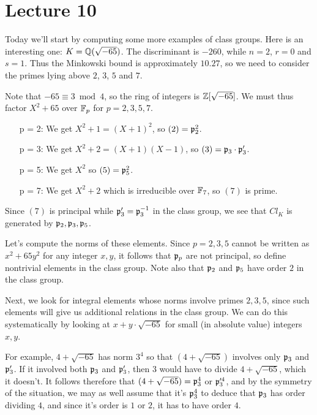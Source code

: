 \section{Lecture 10}

Today we'll start by computing some more examples of class groups.
Here is an interesting one: $K = \mathbb{Q}(\sqrt{-65})$.
The discriminant is $-260$, while $n = 2$, $r = 0$ and $s = 1$.
Thus the Minkowski bound is approximately $10.27$, so we need to consider the primes lying above $2$, $3$, $5$ and $7$.

Note that $-65 \equiv 3 \bmod 4$, so the ring of integers is $\mathbb{Z}[\sqrt{-65}]$.
We must thus factor $X^{2} + 65$ over $\mathbb{F}_{p}$ for $p = 2,3,5,7$.
\begin{enumerate}
  \item[p = 2:] We get $X^{2}+1 = (X+1)^{2}$, so $(2) = \mathfrak{p}_{2}^{2}$.
  \item[p = 3:] We get $X^{2}+2 = (X+1)(X-1)$, so $(3) = \mathfrak{p}_{3} \cdot \mathfrak{p}_{3}'$.
  \item[p = 5:] We get $X^{2}$ so $(5) = \mathfrak{p}_{5}^{2}$.
  \item[p = 7:] We get $X^{2} + 2$ which is irreducible over $\mathbb{F}_{7}$, so $(7)$ is prime.
\end{enumerate}
Since $(7)$ is principal while $\mathfrak{p}_{3}' = \mathfrak{p}_{3}^{-1}$ in the class group, we see that $Cl_{K}$ is generated by $\mathfrak{p}_{2},\mathfrak{p}_{3},\mathfrak{p}_{5}$.

Let's compute the norms of these elements.
Since $p = 2,3,5$ cannot be written as $x^{2} + 65 y^{2}$ for any integer $x,y$, it follows that $\mathfrak{p}_{p}$ are not principal, so define nontrivial elements in the class group.
Note also that $\mathfrak{p}_{2}$ and $\mathfrak{p}_{5}$ have order $2$ in the class group.

Next, we look for integral elements whose norms involve primes $2,3,5$, since such elements will give us additional relations in the class group.
We can do this systematically by looking at $x + y \cdot \sqrt{-65}$ for small (in absolute value) integers $x,y$.

For example, $4 + \sqrt{-65}$ has norm $3^{4}$ so that $(4 + \sqrt{-65})$ involves only $\mathfrak{p}_{3}$ and $\mathfrak{p}_{3}'$.
If it involved both $\mathfrak{p}_{3}$ and $\mathfrak{p}_{3}'$, then $3$ would have to divide $4 + \sqrt{-65}$, which it doesn't.
It follows therefore that $(4 + \sqrt{-65}) = \mathfrak{p}_{3}^{4}$ or $\mathfrak{p}_{3}'^{4}$, and by the symmetry of the situation, we may as well assume that it's $\mathfrak{p}_{3}^{4}$ to deduce that $\mathfrak{p}_{3}$ has order dividing $4$, and since it's order is  $1$ or $2$, it has to have order $4$.

